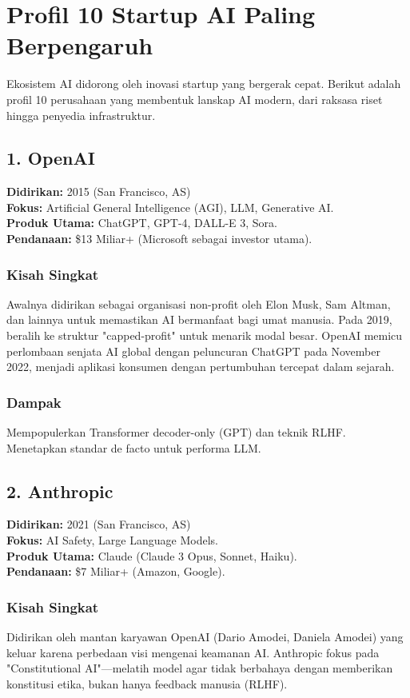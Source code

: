 \chapter{Profil 10 Startup AI Paling Berpengaruh}
\label{chap:startups}

Ekosistem AI didorong oleh inovasi startup yang bergerak cepat. Berikut adalah profil 10 perusahaan yang membentuk lanskap AI modern, dari raksasa riset hingga penyedia infrastruktur.

\section{1. OpenAI}
\textbf{Didirikan:} 2015 (San Francisco, AS) \\
\textbf{Fokus:} Artificial General Intelligence (AGI), LLM, Generative AI. \\
\textbf{Produk Utama:} ChatGPT, GPT-4, DALL-E 3, Sora. \\
\textbf{Pendanaan:} \$13 Miliar+ (Microsoft sebagai investor utama).

\subsection*{Kisah Singkat}
Awalnya didirikan sebagai organisasi non-profit oleh Elon Musk, Sam Altman, dan lainnya untuk memastikan AI bermanfaat bagi umat manusia. Pada 2019, beralih ke struktur "capped-profit" untuk menarik modal besar. OpenAI memicu perlombaan senjata AI global dengan peluncuran ChatGPT pada November 2022, menjadi aplikasi konsumen dengan pertumbuhan tercepat dalam sejarah.

\subsection*{Dampak}
Mempopulerkan Transformer decoder-only (GPT) dan teknik RLHF. Menetapkan standar de facto untuk performa LLM.

\section{2. Anthropic}
\textbf{Didirikan:} 2021 (San Francisco, AS) \\
\textbf{Fokus:} AI Safety, Large Language Models. \\
\textbf{Produk Utama:} Claude (Claude 3 Opus, Sonnet, Haiku). \\
\textbf{Pendanaan:} \$7 Miliar+ (Amazon, Google).

\subsection*{Kisah Singkat}
Didirikan oleh mantan karyawan OpenAI (Dario Amodei, Daniela Amodei) yang keluar karena perbedaan visi mengenai keamanan AI. Anthropic fokus pada "Constitutional AI"---melatih model agar tidak berbahaya dengan memberikan konstitusi etika, bukan hanya feedback manusia (RLHF).

